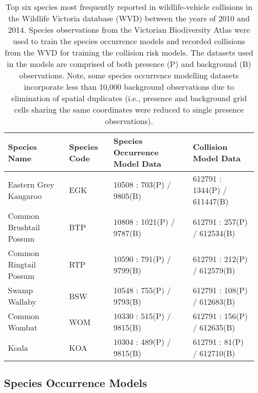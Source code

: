 \begin{table}[!t]
\caption[Six mammal species most frequently reported in wildlife-vehicle collisions]{Top six species most frequently reported in wildlife-vehicle collisions in the Wildlife Victoria database (WVD) between the years of 2010 and 2014. Species observations from the Victorian Biodiversity Atlas were used to train the species occurrence models and recorded collisions from the WVD for training the collision risk models. The datasets used in the models are comprised of both presence (P) and background (B) observations. Note, some species occurrence modelling datasets incorporate less than 10,000 background observations due to elimination of spatial duplicates (i.e., presence and background grid cells sharing the same coordinates were reduced to single presence observations).}
\centering
\setlength{\extrarowheight}{.5em}
\begin{tabularx}{0.9\textwidth}{Ylll} \toprule
Species Name                     &Species Code     &Species Occurrence Model Data     &Collision Model Data \\ \midrule 
Eastern Grey Kangaroo 	& EGK	& 10508 : 703(P) / 9805(B) 	& 612791 : 1344(P) / 611447(B) \\ 
Common Brushtail Possum & BTP	& 10808 : 1021(P) / 9787(B)	& 612791 : 257(P) / 612534(B) \\ 
Common Ringtail Possum 	& RTP	& 10590 : 791(P) / 9799(B)	& 612791 : 212(P) / 612579(B) \\ 
Swamp Wallaby		 	& BSW	& 10548 : 755(P) / 9793(B) 	& 612791 : 108(P) / 612683(B) \\ 
Common Wombat 			& WOM	& 10330 : 515(P) / 9815(B) 	& 612791 : 156(P) / 612635(B) \\ 
Koala 					& KOA 	& 10304 : 489(P) / 9815(B) 	& 612791 : 81(P) / 612710(B) \\ 
\bottomrule
\end{tabularx}
\label{6sp_species_data}
\end{table}

\subsection{Species Occurrence Models}


